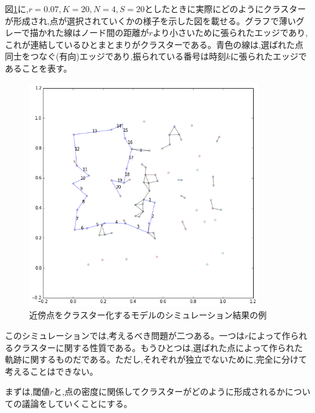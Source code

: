 図\ref{fig:f15}に,$r=0.07, K=20, N=4, S=20$としたときに実際にどのようにクラスターが形成され,点が選択されていくかの様子を示した図を載せる。グラフで薄いグレーで描かれた線はノード間の距離が$r$より小さいために張られたエッジであり,これが連結しているひとまとまりがクラスターである。青色の線は,選ばれた点同士をつなぐ(有向)エッジであり,振られている番号は時刻$k$に張られたエッジであることを表す。
\begin{figure}[H]
    \begin{center}
        \includegraphics[width=10cm]{../img/cluster.png}
        \caption{近傍点をクラスター化するモデルのシミュレーション結果の例}
        \label{fig:f15}
    \end{center}
\end{figure}

このシミュレーションでは,考えるべき問題が二つある。一つは$r$によって作られるクラスターに関する性質である。もうひとつは,選ばれた点によって作られた軌跡に関するものだである。ただし,それぞれが独立でないために,完全に分けて考えることはできない。

まずは,閾値$r$と,点の密度に関係してクラスターがどのように形成されるかについての議論をしていくことにする。

